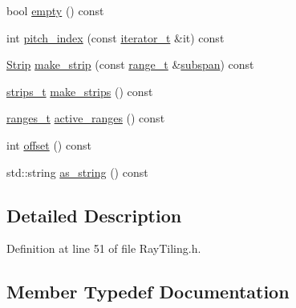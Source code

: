 \begin{DoxyCompactItemize}
\item 
bool \hyperlink{class_wire_cell_1_1_ray_grid_1_1_activity_a3b387437e1942ce62001daa39cd1631f}{empty} () const
\item 
int \hyperlink{class_wire_cell_1_1_ray_grid_1_1_activity_add0847697b47de9b2e1c6c6d46cc31e7}{pitch\+\_\+index} (const \hyperlink{class_wire_cell_1_1_ray_grid_1_1_activity_a4e6dc9c676d517a5819962b10a2638fe}{iterator\+\_\+t} \&it) const
\item 
\hyperlink{struct_wire_cell_1_1_ray_grid_1_1_strip}{Strip} \hyperlink{class_wire_cell_1_1_ray_grid_1_1_activity_a08432ca0d7411ba1c990e2e53b46975d}{make\+\_\+strip} (const \hyperlink{class_wire_cell_1_1_ray_grid_1_1_activity_af70e5851ae6fb8d76415033c0f90cb3e}{range\+\_\+t} \&\hyperlink{class_wire_cell_1_1_ray_grid_1_1_activity_a0c8f129658f18402202b7c9605dfe26f}{subspan}) const
\item 
\hyperlink{namespace_wire_cell_1_1_ray_grid_a06c9ce08c0358d22fae3185aff8a9b7c}{strips\+\_\+t} \hyperlink{class_wire_cell_1_1_ray_grid_1_1_activity_a4319dbeecdffdfe805f768530e0cbe9f}{make\+\_\+strips} () const
\item 
\hyperlink{class_wire_cell_1_1_ray_grid_1_1_activity_ac1614e7c72c06f7be7c03a80a25b024b}{ranges\+\_\+t} \hyperlink{class_wire_cell_1_1_ray_grid_1_1_activity_aae8ad1d5d95c9f5f4668975db2b68f3b}{active\+\_\+ranges} () const
\item 
int \hyperlink{class_wire_cell_1_1_ray_grid_1_1_activity_a8c051a729c264f4ca6e91e21e6edf729}{offset} () const
\item 
std\+::string \hyperlink{class_wire_cell_1_1_ray_grid_1_1_activity_ad8e90c0bc1426818082926b28e280b50}{as\+\_\+string} () const
\end{DoxyCompactItemize}


\subsection{Detailed Description}


Definition at line 51 of file Ray\+Tiling.\+h.



\subsection{Member Typedef Documentation}
\mbox{\label{class_wire_cell_1_1_ray_grid_1_1_activity_a4e6dc9c676d517a5819962b10a2638fe}} 

